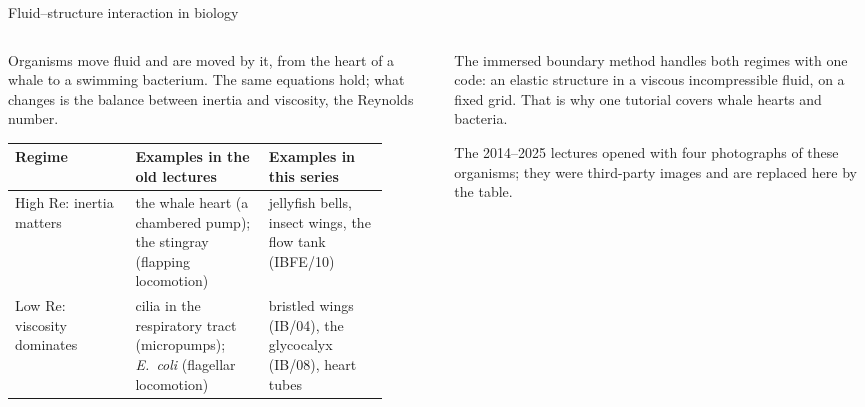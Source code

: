 \documentclass[aspectratio=169,11pt]{beamer}
\begin{document}
\begin{frame}{Fluid--structure interaction in biology}
\begin{columns}[T,onlytextwidth]
\begin{column}{0.55\textwidth}
Organisms move fluid and are moved by it, from the heart of a whale to a swimming bacterium. The same equations hold; what changes is the balance between inertia and viscosity, the Reynolds number.
\scriptsize
\begin{tabular}{@{}L{0.28\linewidth}L{0.31\linewidth}L{0.29\linewidth}@{}}
\toprule
Regime & Examples in the old lectures & Examples in this series\\
\midrule
High Re: inertia matters & the whale heart (a chambered pump); the stingray (flapping locomotion) & jellyfish bells, insect wings, the flow tank (IBFE/10)\\
Low Re: viscosity dominates & cilia in the respiratory tract (micropumps); \emph{E.\ coli} (flagellar locomotion) & bristled wings (IB/04), the glycocalyx (IB/08), heart tubes\\
\bottomrule
\end{tabular}
\end{column}
\begin{column}{0.43\textwidth}
\begin{punchbox}
\small The immersed boundary method handles both regimes with one code: an elastic structure in a viscous incompressible fluid, on a fixed grid. That is why one tutorial covers whale hearts and bacteria.
\end{punchbox}
\vspace{2mm}
\small The 2014--2025 lectures opened with four photographs of these organisms; they were third-party images and are replaced here by the table.
\end{column}
\end{columns}
\end{frame}
\end{document}
